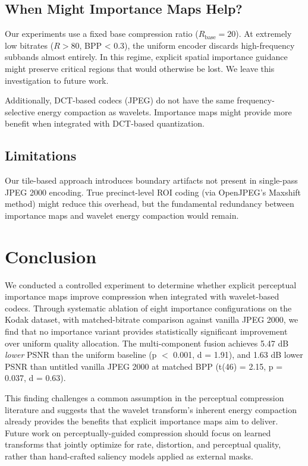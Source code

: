\documentclass[conference]{IEEEtran}
\begin{document}
\subsection{When Might Importance Maps Help?}

Our experiments use a fixed base compression ratio ($R_{\text{base}} = 20$).
At extremely low bitrates ($R > 80$, BPP < 0.3), the uniform encoder discards
high-frequency subbands almost entirely. In this regime, explicit spatial
importance guidance might preserve critical regions that would otherwise be
lost. We leave this investigation to future work.

Additionally, DCT-based codecs (JPEG) do not have the same frequency-selective
energy compaction as wavelets. Importance maps might provide more benefit when
integrated with DCT-based quantization.

\subsection{Limitations}

Our tile-based approach introduces boundary artifacts not present in
single-pass JPEG 2000 encoding. True precinct-level ROI coding (via OpenJPEG's
Maxshift method) might reduce this overhead, but the fundamental redundancy
between importance maps and wavelet energy compaction would remain.

\section{Conclusion}

We conducted a controlled experiment to determine whether explicit perceptual
importance maps improve compression when integrated with wavelet-based codecs.
Through systematic ablation of eight importance configurations on the Kodak
dataset, with matched-bitrate comparison against vanilla JPEG 2000, we find
that no importance variant provides statistically significant improvement
over uniform quality allocation. The multi-component fusion achieves
5.47 dB \textit{lower} PSNR than the uniform baseline (p $<$ 0.001, d = 1.91),
and 1.63 dB lower PSNR than untitled vanilla JPEG 2000 at matched BPP
(t(46) = 2.15, p = 0.037, d = 0.63).

This finding challenges a common assumption in the perceptual compression
literature and suggests that the wavelet transform's inherent energy
compaction already provides the benefits that explicit importance maps
aim to deliver. Future work on perceptually-guided compression should
focus on learned transforms that jointly optimize for rate, distortion,
and perceptual quality, rather than hand-crafted saliency models applied
as external masks.
\end{document}
